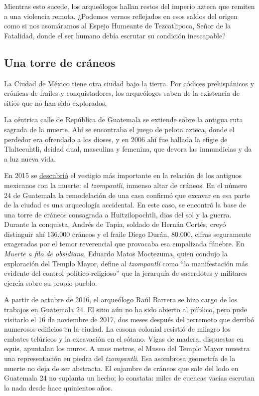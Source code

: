 Mientras esto sucede, los arqueólogos hallan restos del imperio azteca
que remiten a una violencia remota. ¿Podemos vernos reflejados en esos
saldos del origen como si nos asomáramos al Espejo Humeante de
Tezcatlipoca, Señor de la Fatalidad, donde el ser humano debía escrutar
su condición inescapable?

\hypertarget{una-torre-de-cruxe1neos}{%
\subsection{Una torre de cráneos}\label{una-torre-de-cruxe1neos}}

La Ciudad de México tiene otra ciudad bajo la tierra. Por códices
prehispánicos y crónicas de frailes y conquistadores, los arqueólogos
saben de la existencia de sitios que no han sido explorados.

La céntrica calle de República de Guatemala se extiende sobre la antigua
ruta sagrada de la muerte. Ahí se encontraba el juego de pelota azteca,
donde el perdedor era ofrendado a los dioses, y en 2006 ahí fue hallada
la efigie de Tlaltecuhtli, deidad dual, masculina y femenina, que devora
las inmundicias y da a luz nueva vida.

En 2015 se
\href{https://historia.nationalgeographic.com.es/a/descubren-gran-tzompantli-tenochtitlan_9609/1}{descubrió}
el vestigio más importante en la relación de los antiguos mexicanos con
la muerte: el \emph{tzompantli}, inmenso altar de cráneos. En el número
24 de Guatemala la remodelación de una casa confirmó que excavar en esa
parte de la ciudad es una arqueología accidental. En este caso, se
encontró la base de una torre de cráneos consagrada a Huitzilopochtli,
dios del sol y la guerra. Durante la conquista, Andrés de Tapia, soldado
de Hernán Cortés, creyó distinguir ahí 136.000 cráneos y el fraile Diego
Durán, 80.000, cifras seguramente exageradas por el temor reverencial
que provocaba esa empalizada fúnebre. En \emph{Muerte a filo de
obsidiana}, Eduardo Matos Moctezuma, quien condujo la exploración del
Templo Mayor, define al \emph{tzompantli} como ``la manifestación más
evidente del control político-religioso'' que la jerarquía de sacerdotes
y militares ejercía sobre su propio pueblo.

A partir de octubre de 2016, el arqueólogo Raúl Barrera se hizo cargo de
los trabajos en Guatemala 24. El sitio aún no ha sido abierto al
público, pero pude visitarlo el 16 de noviembre de 2017, dos meses
después del terremoto que derribó numerosos edificios en la ciudad. La
casona colonial resistió de milagro los embates telúricos y la
excavación en el sótano. Vigas de madera, dispuestas en equis, apuntalan
los muros. A unos metros, el Museo del Templo Mayor muestra una
representación en piedra del \emph{tzompantli}. Esa asombrosa geometría
de la muerte no deja de ser abstracta. El enjambre de cráneos que sale
del lodo en Guatemala 24 no suplanta un hecho; lo constata: miles de
cuencas vacías escrutan la nada desde hace quinientos años.

